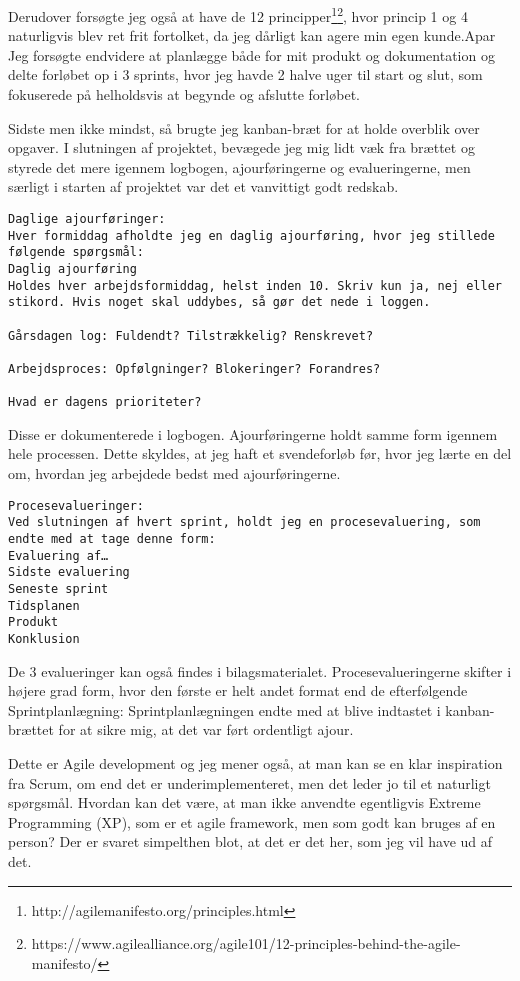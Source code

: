 \documentclass{report}
\begin{document}
Derudover forsøgte jeg også at have de 12 principper\footnote{http://agilemanifesto.org/principles.html}\footnote{https://www.agilealliance.org/agile101/12-principles-behind-the-agile-manifesto/}, hvor princip 1 og 4 naturligvis blev  ret frit fortolket, da jeg dårligt kan agere min egen kunde.Apar{}
Jeg forsøgte endvidere at planlægge både for mit produkt og dokumentation og delte forløbet op i 3 sprints, hvor jeg havde 2 halve uger til start og slut, som fokuserede på helholdsvis at begynde og afslutte forløbet.\par{}
Sidste men ikke mindst, så brugte jeg kanban-bræt for at holde overblik over opgaver. I slutningen af projektet, bevægede jeg mig lidt væk fra brættet og styrede det mere igennem logbogen, ajourføringerne og evalueringerne, men særligt i starten af projektet var det et vanvittigt godt redskab.
\begin{lstlisting}
Daglige ajourføringer:
Hver formiddag afholdte jeg en daglig ajourføring, hvor jeg stillede følgende spørgsmål:
Daglig ajourføring
Holdes hver arbejdsformiddag, helst inden 10. Skriv kun ja, nej eller stikord. Hvis noget skal uddybes, så gør det nede i loggen.

Gårsdagen log: Fuldendt? Tilstrækkelig? Renskrevet?

Arbejdsproces: Opfølgninger? Blokeringer? Forandres?

Hvad er dagens prioriteter?

\end{lstlisting}
Disse er dokumenterede i logbogen. Ajourføringerne holdt samme form igennem hele processen. Dette skyldes, at jeg haft et svendeforløb før, hvor jeg lærte en del om, hvordan jeg arbejdede bedst med ajourføringerne.

\begin{lstlisting}
Procesevalueringer:
Ved slutningen af hvert sprint, holdt jeg en procesevaluering, som endte med at tage denne form:
Evaluering af…
Sidste evaluering
Seneste sprint
Tidsplanen
Produkt
Konklusion
\end{lstlisting}

De 3 evalueringer kan også findes i bilagsmaterialet. Procesevalueringerne skifter i højere grad form, hvor den første er helt andet format end de efterfølgende
Sprintplanlægning:
Sprintplanlægningen endte med at blive indtastet i kanban-brættet for at  sikre mig, at det var ført ordentligt ajour.

Dette er Agile development og jeg mener også, at man kan se en klar inspiration fra Scrum, om end det er underimplementeret, men det leder jo til et naturligt spørgsmål. Hvordan kan det være, at man ikke anvendte egentligvis Extreme Programming (XP), som  er et agile framework, men som godt kan bruges af en person? Der er svaret simpelthen blot, at det er det her, som jeg vil have ud af det.
\end{document}
